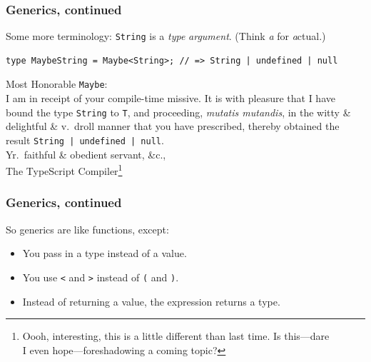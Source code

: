 \documentclass[aspectratio=169]{beamer}
\begin{document}
\begin{frame}[fragile]
  \frametitle{Generics, continued}
  \small

  Some more terminology: \texttt{String} is a \emph{type} \textit{argument}.
  (Think \textit{a} for \textit{a}ctual.)

  \vspace{1em}

  \footnotesize
  \begin{verbatim}
type MaybeString = Maybe<String>; // => String | undefined | null
  \end{verbatim}
  \small

  \vspace{1em}

  \begin{tcolorbox}
    Most Honorable \texttt{Maybe}: \\

    I am in receipt of your compile-time missive. It is with pleasure that
    I have bound the type \texttt{String} to \texttt{T}, and proceeding,
    \textit{mutatis mutandis}, in the witty \& delightful \& v.\ droll manner
    that you have prescribed, thereby obtained the result
    \texttt{String | undefined | null}. \\

    Yr.\ faithful \& obedient servant, \&c., \\
    The TypeScript Compiler\footnote{Oooh, interesting, this is a little
      different than last time. Is this---dare \\ I even hope---foreshadowing
      a coming topic?}
  \end{tcolorbox}
\end{frame}


\begin{frame}
  \frametitle{Generics, continued}

  So generics are like functions, except: \\

  \begin{itemize}
    \item You pass in a type instead of a value.
    \item You use \texttt{<} and \texttt{>} instead of \texttt{(} and
          \texttt{)}.
    \item Instead of returning a value, the expression returns a type.
  \end{itemize}
\end{frame}
\end{document}
